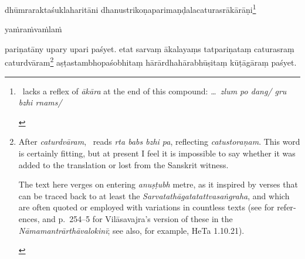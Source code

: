 \documentclass[naipra.tex]{subfiles}
\begin{document}
\begin{sanskrit}
{\begin{english}
	\end{english}
} dhūmraraktaśuklaharitāni dhanustrikoṇaparimaṇḍalacaturasrākārāṇi\footnote{
	\begin{english}%
		\TIB\ lacks a reflex of \emph{ākāra} at the end of this compound: \emph{\ldots\ zlum po dang/ gru bzhi rnams/}
	\end{english}
} \begin{mantra}yaṁ\dsh raṁ\dsh vaṁ\dsh laṁ\dsh \end{mantra}pariṇatāny upary upari paśyet. 
etat sarvaṃ  ākalayaṃs tatpariṇataṃ caturasraṃ caturdvāram\footnote{
	\begin{english}%
		After \emph{caturdvāram}, \TIB\ reads \emph{rta babs bzhi pa}, reflecting \emph{catustoraṇam}.
		This word is certainly fitting, but at present I feel it is impossible to say whether it was added to the translation or lost from the Sanskrit witness.

		The text here verges on entering \emph{anuṣṭubh} metre, as it inspired by verses that can be traced back to at least the \emph{Sarvatathāgatatattvasaṅgraha}, and which are often quoted or employed with variations in countless texts (see \cite[143 n.\ 24]{tribe2016} for references, and p.\ 254–5 for Vilāsavajra's version of these in the \emph{Nāmamantrārthāvalokinī}; see also, for example, HeTa 1.10.21).
	\end{english}
} aṣṭastambhopaśobhitaṃ hārārdhahārabhūṣitaṃ kūṭāgāraṃ paśyet. 
\pend



\end{sanskrit}
\end{document}
